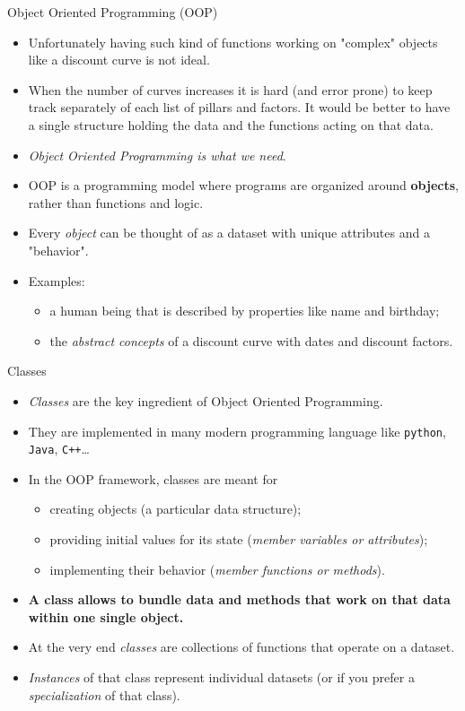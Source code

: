 \documentclass{beamer}
\begin{document}
\begin{frame}{Object Oriented Programming (OOP)}
  \begin{itemize}
  \item Unfortunately having such kind of functions working on "complex" objects like a discount curve is not ideal.
  \item When the number of curves increases it is hard (and error prone) to keep track separately of each list of pillars and factors. It would be better to have a single structure holding the data and the functions acting on that data. 
  \item \emph{Object Oriented Programming is what we need}.
  \item OOP is a programming model where programs are organized around \textbf{objects}, rather than functions and logic.
  \item Every \emph{object} can be thought of as a dataset with unique attributes and a "behavior".
  \item Examples:
    \begin{itemize}
    \item a human being that is described by properties like name and birthday;
    \item the \emph{abstract concepts} of a discount curve with dates and discount factors.
    \end{itemize}
  \end{itemize}
\end{frame}

\begin{frame}{Classes}
  \begin{itemize}
  \item \emph{Classes} are the key ingredient of Object Oriented Programming.
  \item They are implemented in many modern programming language like \texttt{python}, \texttt{Java}, \texttt{C++}\ldots
  \item In the OOP framework, classes are meant for
    \begin{itemize}
    \item creating objects (a particular data structure);
    \item providing initial values for its state (\emph{member variables or attributes});
    \item implementing their behavior (\emph{member functions or methods}).
    \end{itemize}
  \item \textbf{A class allows to bundle data and methods that work on that data within one single object.}
  \item At the very end \emph{classes} are collections of functions that operate on a dataset. 
  \item \emph{Instances} of that class represent individual datasets (or if you prefer a \emph{specialization} of that class).
  \end{itemize}
\end{frame}
\end{document}
